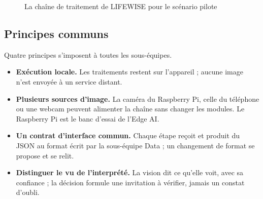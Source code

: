 \begin{figure}[H]
  \centering
  \caption{La chaîne de traitement de LIFEWISE pour le scénario pilote}
  \label{fig:chaine}
\end{figure}

\subsection{Principes communs}

Quatre principes s'imposent à toutes les sous-équipes.

\begin{itemize}
  \item \textbf{Exécution locale.} Les traitements restent sur l'appareil ; aucune image n'est envoyée à un service distant.
  \item \textbf{Plusieurs sources d'image.} La caméra du Raspberry Pi, celle du téléphone ou une webcam peuvent alimenter la chaîne sans changer les modules. Le Raspberry Pi est le banc d'essai de l'Edge AI.
  \item \textbf{Un contrat d'interface commun.} Chaque étape reçoit et produit du JSON au format écrit par la sous-équipe Data ; un changement de format se propose et se relit.
  \item \textbf{Distinguer le vu de l'interprété.} La vision dit ce qu'elle voit, avec sa confiance ; la décision formule une invitation à vérifier, jamais un constat d'oubli.
\end{itemize}


